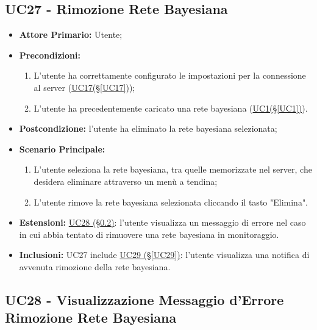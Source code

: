 \pagebreak

\subsection{UC27 - Rimozione Rete Bayesiana}\label{UC27}

\begin{itemize}
	\item \textbf{Attore Primario:} Utente;
	\item \textbf{Precondizioni:}
	\begin{enumerate}
 		\item L'utente ha correttamente configurato le impostazioni per la connessione al server (\hyperref[UC17]{UC17(§\ref*{UC17})});
 		\item L'utente ha precedentemente caricato una rete bayesiana (\hyperref[UC1]{UC1(§\ref*{UC1})}).
	\end{enumerate}
	\item \textbf{Postcondizione:} l'utente ha eliminato la rete bayesiana selezionata;
	\item \textbf{Scenario Principale:}
	\begin{enumerate}
		\item L'utente seleziona la rete bayesiana, tra quelle memorizzate nel server, che desidera eliminare attraverso un menù a tendina;
		\item L'utente rimove la rete bayesiana selezionata cliccando il tasto "Elimina".
	\end{enumerate}
	\item \textbf{Estensioni:} \hyperref[UC28]{UC28 (§\ref*{UC28})}: l'utente visualizza un messaggio di errore nel caso in cui abbia tentato di rimuovere una rete bayesiana in monitoraggio.
	\item \textbf{Inclusioni:} UC27 include \hyperref[UC29]{UC29 (§\ref*{UC29})}: l'utente visualizza una notifica di avvenuta rimozione della rete bayesiana.
\end{itemize}

\pagebreak

\subsection{UC28 - Visualizzazione Messaggio d'Errore Rimozione Rete Bayesiana}\label{UC28}

